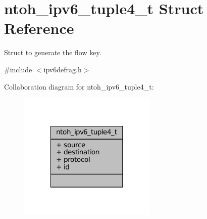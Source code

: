 \hypertarget{structntoh__ipv6__tuple4__t}{\section{ntoh\-\_\-ipv6\-\_\-tuple4\-\_\-t Struct Reference}
\label{structntoh__ipv6__tuple4__t}
}


Struct to generate the flow key.  




{\ttfamily \#include $<$ipv6defrag.\-h$>$}



Collaboration diagram for ntoh\-\_\-ipv6\-\_\-tuple4\-\_\-t\-:
\nopagebreak
\begin{figure}[H]
\begin{center}
\leavevmode
\includegraphics[width=186pt]{structntoh__ipv6__tuple4__t__coll__graph}
\end{center}
\end{figure}
